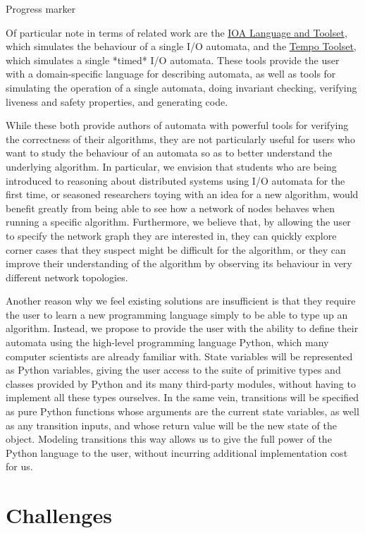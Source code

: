 \documentclass{scrartcl}
\begin{document}
{\color{red}Progress marker}

Of particular note in terms of related work are the
\href{http://groups.csail.mit.edu/tds/ioa/}{IOA Language and Toolset}, which
simulates the behaviour of a single I/O automata, and the
\href{http://www.veromodo.com/}{Tempo Toolset}, which simulates a single
*timed* I/O automata. These tools provide the user with a domain-specific
language for describing automata, as well as tools for simulating the operation
of a single automata, doing invariant checking, verifying liveness and safety
properties, and generating code.

While these both provide authors of automata with powerful tools for verifying
the correctness of their algorithms, they are not particularly useful for
users who want to study the behaviour of an automata so as to better understand
the underlying algorithm. In particular, we envision that students who are
being introduced to reasoning about distributed systems using I/O automata for
the first time, or seasoned researchers toying with an idea for a new
algorithm, would benefit greatly from being able to see how a network of nodes
behaves when running a specific algorithm. Furthermore, we believe that, by
allowing the user to specify the network graph they are interested in, they can
quickly explore corner cases that they suspect might be difficult for the
algorithm, or they can improve their understanding of the algorithm by
observing its behaviour in very different network topologies.

Another reason why we feel existing solutions are insufficient is that they
require the user to learn a new programming language simply to be able to type
up an algorithm. Instead, we propose to provide the user with the ability to
define their automata using the high-level programming language Python, which
many computer scientists are already familiar with. State variables will be
represented as Python variables, giving the user access to the suite of
primitive types and classes provided by Python and its many third-party
modules, without having to implement all these types ourselves. In the same
vein, transitions will be specified as pure Python functions whose arguments
are the current state variables, as well as any transition inputs, and whose
return value will be the new state of the object. Modeling transitions this way
allows us to give the full power of the Python language to the user, without
incurring additional implementation cost for us.

\section{Challenges}
\end{document}
